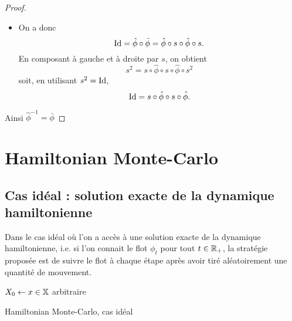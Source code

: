 \documentclass[10pt,a4paper]{article}
\begin{document}
\begin{proof}
\begin{itemize}
		\item On a donc
		$$\operatorname{Id} = \hat \phi \circ \bar \phi = \hat \phi \circ s \circ \hat \phi \circ s.$$
		En composant à gauche et à droite par $s$, on obtient
		$$s^2 = s \circ \hat \phi \circ s \circ \hat \phi \circ s^2$$
		soit, en utilisant $s^2 = \operatorname{Id}$,
		$$\operatorname{Id} = s \circ \hat \phi \circ s \circ \hat \phi.$$
	\end{itemize}
	Ainsi $\hat{\phi}^{-1} = \bar{\phi}$
\end{proof}


\section{Hamiltonian Monte-Carlo}

\subsection{Cas idéal : solution exacte de la dynamique hamiltonienne}

Dans le cas idéal où l'on a accès à une solution exacte de la dynamique hamiltonienne, i.e. si l'on connait le flot $\phi_t$ pour tout $t \in \mathbb{R}_+$, la stratégie proposée est de suivre le flot à chaque étape après avoir tiré aléatoirement une quantité de mouvement.

\begin{center}
	\begin{algorithm}[H]
		$X_0 \leftarrow x \in \mathbb{X}$ arbitraire\;
		\caption{Hamiltonian Monte-Carlo, cas idéal}
		\label{algo:HMC-ideal}
	\end{algorithm}
\end{center}
\end{document}
